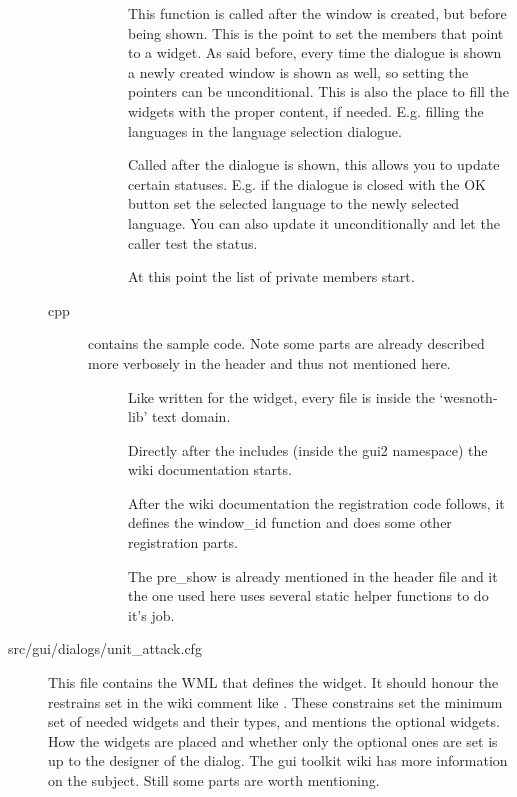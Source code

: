 \begin{description}
\begin{description}
\begin{description}
	\item[]
		This function is called after the window is created, but before being
shown. This is the point to set the members that point to a widget. As said
before, every time the dialogue is shown a newly created window is shown as well, so
setting the pointers can be unconditional. This is also the place to fill the
widgets with the proper content, if needed. E.g. filling the languages in the
language selection dialogue.

	\item[]
		Called after the dialogue is shown, this allows you to update certain
statuses. E.g. if the dialogue is closed with the OK button set the selected
language to the newly selected language. You can also update it unconditionally
and let the caller test the status.

	\item[]
		At this point the list of private members start.

	\end{description}

\item[cpp]  contains the sample code. Note some
parts are already described more verbosely in the header and thus not mentioned
here.
	\begin{description}
	\item[]
		Like written for the widget, every file is inside the `wesnoth-lib' text
domain.

	\item[]
		Directly after the includes (inside the gui2 namespace) the wiki
documentation starts.

	\item[]
		After the wiki documentation the registration code follows, it defines
the window\_id function and does some other registration parts.

	\item[]
		The pre\_show is already mentioned in the header file and it the one
used here uses several static helper functions to do it's job.

	\end{description}

\end{description}

\item[src/gui/dialogs/unit\_attack.cfg]
	This file contains the WML that defines the widget. It should honour the
restrains set in the wiki comment like . These
constrains set the minimum set of needed widgets and their types, and mentions
the optional widgets. How the widgets are placed and whether only the optional
ones are set is up to the designer of the dialog. The gui toolkit wiki has more
information on the subject. Still some parts are worth mentioning.


\end{description}
